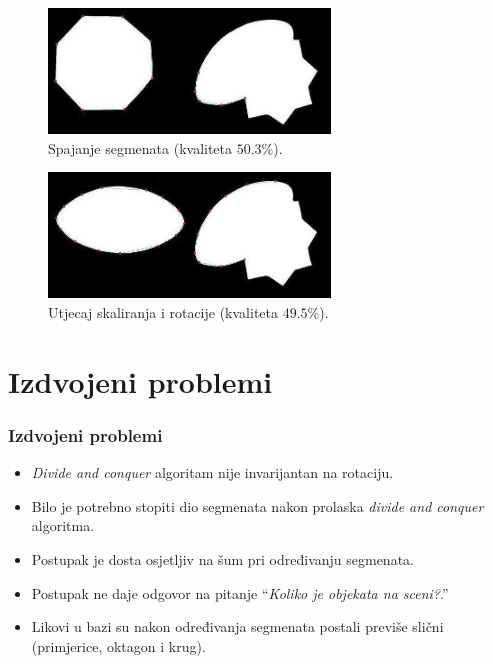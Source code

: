 \documentclass{beamer}
\begin{document}
\begin{frame}
\begin{figure}[!h]
\begin{center}
\includegraphics[width=7.5cm]{resources/oktagon-spoj.png}
\end{center}
\caption{Spajanje segmenata (kvaliteta $50.3\%$).} 
\label{fig:segmenti-treca}
\end{figure}
\begin{figure}[!h]
\begin{center}
\includegraphics[width=7.5cm]{resources/elipsa-spoj.png}
\end{center}
\caption{Utjecaj skaliranja i rotacije (kvaliteta $49.5\%$).} 
\label{fig:segmenti-rotacija}
\end{figure}
\end{frame}

\section{Izdvojeni problemi}
\begin{frame}
\frametitle{Izdvojeni problemi}
\begin{itemize}
  \item \emph{Divide and conquer} algoritam nije invarijantan na rotaciju.
  \item Bilo je potrebno stopiti dio segmenata nakon prolaska \emph{divide and conquer} algoritma.
  \item Postupak je dosta osjetljiv na šum pri određivanju segmenata. 
  \item Postupak ne daje odgovor na pitanje ``\emph{Koliko je objekata na sceni?}.''
  \item Likovi u bazi su nakon određivanja segmenata postali previše slični (primjerice, oktagon i krug).
\end{itemize}
\end{frame}
\end{document}
